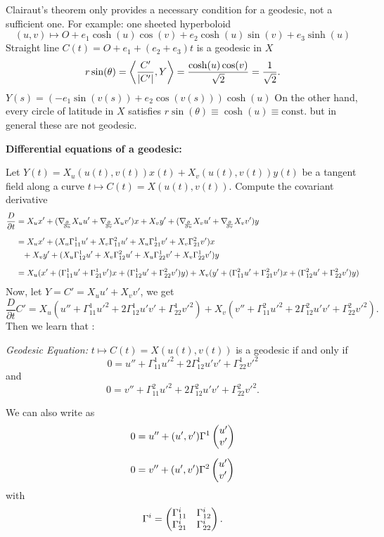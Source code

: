 \begin{remark, example}
	Clairaut's theorem only provides a necessary condition for a geodesic, not a sufficient one.
	For example: one sheeted hyperboloid
		\[ (u,v) \mapsto O + e_1\cosh(u) \cos(v) + e_2 \cosh(u) \sin(v) + e_3 \sinh(u) \]
	Straight line $ C(t) = O + e_1 + (e_2 +e_3)t $ is a geodesic in $ X $
		\[r \sin (\theta) = \left \langle \dfrac{C'}{|C'|},Y \right\rangle = \dfrac{\cosh(u) \cos(v)}{\sqrt{2}}= \dfrac{1}{\sqrt{2}}. \]
	$ Y(s) = (-e_1\sin(v(s)) + e_2\cos(v(s)))\cosh(u) $
	On the other hand, every circle of latitude in $ X $ satisfies $ r\sin(\theta) \equiv \cosh(u) \equiv \mathrm{const.} $
	but in general these are not geodesic.	
\end{remark, example}

\textbf{Differential equations of a geodesic:}
	
	Let $ Y(t) = X_u(u(t),v(t))x(t) + X_v(u(t),v(t))y(t) $ be a tangent field along a curve $ t \mapsto C(t) = X(u(t),v(t)). $
	Compute the covariant derivative
	\begin{align*}
		\dfrac{D}{\partial t} 
			&= X_ux' + (\nabla_{\!\!{\partial\over \partial u}} X_u u' + \nabla_{\!\!{\partial\over \partial v}} X_u v')x + X_vy' +  (\nabla_{\!\!{\partial\over \partial u}} X_v u' + \nabla_{\!\!{\partial\over \partial v}} X_v v')y \\[2mm]
		 &= X_ux' + (X_u\Gamma_{11}^1 u' + X_v\Gamma_{11}^2u' + X_u \Gamma_{21}^1v' + X_v \Gamma_{21}^2v')x \\
		 &\phantom{=} +  X_vy' + (X_u\Gamma_{12}^1 u' + X_v\Gamma_{12}^2u' + X_u \Gamma_{22}^1v' + X_v \Gamma_{22}^1v')y \\[2mm]
		 &= X_u(x' + (\Gamma_{11}^1u' + \Gamma_{21}^1v')x + (\Gamma_{12}^1 u' + \Gamma_{22}^2v')y) + X_v(y' + (\Gamma_{11}^2u' + \Gamma_{21}^2v')x + (\Gamma_{12}^2 u' + \Gamma_{22}^2v')y)
	\end{align*}
	Now, let $ Y = C' = X_u u' + X_v v' $, we get
		\[ \dfrac{D}{\partial t} C' = X_u(u'' + \Gamma_{11}^1u'^2 + 2 \Gamma_{12}^1 u'v' +\Gamma_{22}^1 v'^2) + X_v(v'' + \Gamma_{11}^2u'^2 + 2\Gamma_{12}^2u'v' + \Gamma_{22}^2v'^2). \]
	Then we learn that :
	
\begin{definition}
	\emph{Geodesic Equation:} \label{Eq: geodesic}
		$ t \mapsto C(t) = X(u(t),v(t)) $ is a geodesic if and only if
			\[ 0 = u'' + \Gamma_{11}^1u'^2 + 2 \Gamma_{12}^1 u'v' +\Gamma_{22}^1 v'^2 \]
		and
		\[ 0 = v'' + \Gamma_{11}^2u'^2 + 2\Gamma_{12}^2u'v' + \Gamma_{22}^2v'^2. \]
		
		We can also write as
		\begin{align*}
			0&= u'' +(u',v')\Gamma^1\begin{pmatrix} u'\\v' \end{pmatrix}\\[2mm]
			0&= v'' +(u',v')\Gamma^2\begin{pmatrix} u'\\v' \end{pmatrix}
		\end{align*}
		with
			\[ \Gamma^i = \begin{pmatrix} \Gamma_{11}^i & \Gamma_{12}^i\\
								\Gamma_{21}^i & \Gamma_{22}^i \end{pmatrix}. \]
		
\end{definition}

